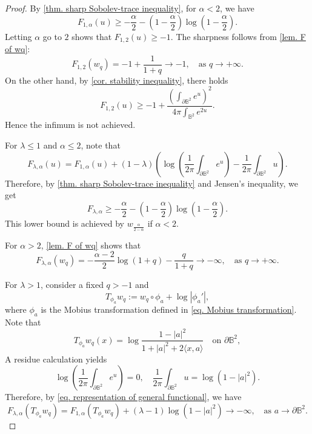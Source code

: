\documentclass[11pt,a4paper,twoside]{amsart}
\newtheorem{sketch proof}{Sketch of the proof}[section]
\begin{document}
    \begin{proof}
        By \cref{thm. sharp Sobolev-trace inequality}, for $\alpha<2$, we have
        \[
        F_{1,\alpha}(u)
        \geq -\frac{\alpha}{2}
        -\left(1-\frac{\alpha}{2}\right)
        \log\left(1-\frac{\alpha}{2}\right).
        \]
        Letting $\alpha$ go to $2$ shows that $F_{1,2}(u)\geq -1$. The sharpness follows from \cref{lem. F of wq}:
        \[
        F_{1,2}(w_q)=-1+\frac{1}{1+q}\to -1,\quad \text{as }q\to+\infty.
        \]
        On the other hand, by \cref{cor. stability inequality}, there holds
        \[
        F_{1,2}(u)\geq -1+
        \frac{\left(
       \int_{\partial\mathbb{B}^2}e^{u}
       \right)^2}
       {4\pi\int_{\mathbb{B}^2}e^{2u}}.
        \]
        Hence the infimum is not achieved.

        \vspace{1em}

        For $\lambda\leq 1$ and $\alpha\leq 2$, note that
        \begin{equation}
        \label{eq. representation of general functional}
            F_{\lambda,\alpha}(u)
        =F_{1,\alpha}(u)
        +(1-\lambda)
        \left(
        \log\left(\frac{1}{2\pi}\int_{\partial\mathbb{B}^2}e^u
        \right)
        -\frac{1}{2\pi}
        \int_{\partial\mathbb{B}^2}u
        \right).
        \end{equation}
        Therefore, by \cref{thm. sharp Sobolev-trace inequality} and Jensen's inequality, we get
        \[
        F_{\lambda,\alpha}
        \geq
        -\frac{\alpha}{2}
        -\left(1-\frac{\alpha}{2}\right)
        \log\left(1-\frac{\alpha}{2}\right).
        \]
        This lower bound is achieved by $w_{\frac{\alpha}{2-\alpha}}$ if $\alpha<2$.

        For $\alpha>2$, \cref{lem. F of wq} shows that
        \[
        F_{\lambda,\alpha}(w_q)
        =-\frac{\alpha-2}{2}\log (1+q)
        -\frac{q}{1+q}\to -\infty,
        \quad \text{as }q\to+\infty.
        \]

        For $\lambda>1$, consider a fixed $q>-1$ and
        \[
        T_{\phi_a}w_q
        :=w_q\circ\phi_a +\log |\phi_a'|,
        \]
        where $\phi_a$ is the Mobius transformation defined in \cref{eq. Mobius transformation}. Note that
        \[
        T_{\phi_a}w_q(x)=\log\frac{1-|a|^2}{1+|a|^2+2\langle x,a\rangle} \quad 
        \text{on }\partial\mathbb{B}^2,
        \]
        A residue calculation yields
        \[
        \log\left(\frac{1}{2\pi}\int_{\partial\mathbb{B}^2}e^u
        \right)
        =0,\quad 
        \frac{1}{2\pi}
        \int_{\partial\mathbb{B}^2}u
        =\log (1-|a|^2).
        \]
        Therefore, by \cref{eq. representation of general functional}, we have
        \[
        F_{\lambda,\alpha}(T_{\phi_a}w_q)
        =F_{1,\alpha}(T_{\phi_a}w_q)
        +(\lambda-1)\log(1-|a|^2)
        \to -\infty,\quad
        \text{as }a\to \partial\mathbb{B}^2.
        \]
    \end{proof}
\end{document}
